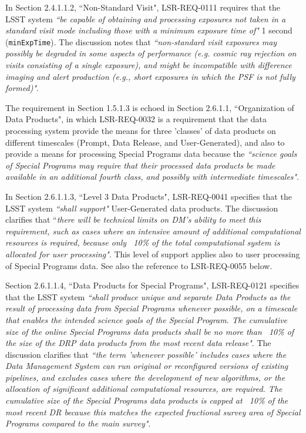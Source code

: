 In Section 2.4.1.1.2, ``Non-Standard Visit", LSR-REQ-0111 requires that the LSST system 
{\it ``be capable of obtaining and processing exposures not taken in a standard visit mode including those with a 
minimum exposure time of"} 1 second ({\tt minExpTime}).
The discussion notes that {\it ``non-standard visit exposures may possibly be degraded in some aspects of performance 
(e.g. cosmic ray rejection on visits consisting of a single exposure), and might be incompatible with difference 
imaging and alert production (e.g., short exposures in which the PSF is not fully formed)"}.

The requirement in Section 1.5.1.3 is echoed in Section 2.6.1.1, ``Organization of Data Products", in which 
LSR-REQ-0032 is a requirement that the data processing system provide the means for three 'classes' of 
data products on different timescales (Prompt, Data Release, and User-Generated), and also to provide a means for 
processing Special Programs data because the {\it ``science goals of Special Programs may require that their processed 
data products be made available in an additional fourth class, and possibly with intermediate timescales"}.

In Section 2.6.1.1.3, ``Level 3 Data Products", LSR-REQ-0041 specifies that the LSST system 
{\it ``shall support"} User-Generated data products.
The discussion clarifies that ``{\it there will be technical limits on DM's ability to meet this requirement, such as 
cases where an intensive amount of additional computational resources is required, because only ~10\% of the total 
computational system is allocated for user processing"}.
This level of support applies also to user processing of Special Programs data.
See also the reference to LSR-REQ-0055 below.

Section 2.6.1.1.4, ``Data Products for Special Programs", LSR-REQ-0121 specifies that the LSST system 
{\it ``shall produce unique and separate Data Products as the result of processing data from Special Programs whenever 
possible, on a timescale that enables the intended science goals of the Special Program.
The cumulative size of the online Special Programs data products shall be no more than ~10\% of the size of the DRP 
data products from the most recent data release"}.
The discussion clarifies that {\it ``the term 'whenever possible' includes cases where the Data Management System can 
run original or reconfigured versions of existing pipelines, and excludes cases where the development of new 
algorithms, or the allocation of significant additional computational resources, are required.
The cumulative size of the Special Programs data products is capped at ~10\% of the most recent DR because this 
matches the expected fractional survey area of Special Programs compared to the main survey"}.

